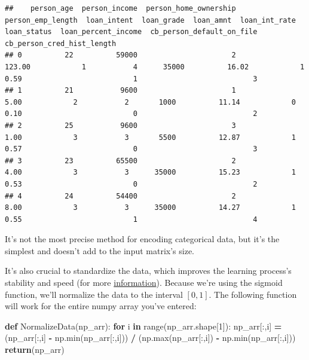 \documentclass[
]{book}
\newenvironment{Shaded}{\begin{snugshade}}{\end{snugshade}}
\newcommand{\BuiltInTok}[1]{#1}
\newcommand{\ControlFlowTok}[1]{\textcolor[rgb]{0.13,0.29,0.53}{\textbf{#1}}}
\newcommand{\DecValTok}[1]{\textcolor[rgb]{0.00,0.00,0.81}{#1}}
\newcommand{\KeywordTok}[1]{\textcolor[rgb]{0.13,0.29,0.53}{\textbf{#1}}}
\newcommand{\NormalTok}[1]{#1}
\newcommand{\OperatorTok}[1]{\textcolor[rgb]{0.81,0.36,0.00}{\textbf{#1}}}
\begin{document}
\begin{verbatim}
##    person_age  person_income  person_home_ownership  person_emp_length  loan_intent  loan_grade  loan_amnt  loan_int_rate  loan_status  loan_percent_income  cb_person_default_on_file  cb_person_cred_hist_length
## 0          22          59000                      2             123.00            1           4      35000          16.02            1                 0.59                          1                           3
## 1          21           9600                      1               5.00            2           2       1000          11.14            0                 0.10                          0                           2
## 2          25           9600                      3               1.00            3           3       5500          12.87            1                 0.57                          0                           3
## 3          23          65500                      2               4.00            3           3      35000          15.23            1                 0.53                          0                           2
## 4          24          54400                      2               8.00            3           3      35000          14.27            1                 0.55                          1                           4
\end{verbatim}

It's not the most precise method for encoding categorical data, but it's the simplest and doesn't add to the input matrix's size.

It's also crucial to standardize the data, which improves the learning process's stability and speed (for more \href{https://machinelearningmastery.com/how-to-improve-neural-network-stability-and-modeling-performance-with-data-scaling/}{information}). Because we're using the sigmoid function, we'll normalize the data to the interval \([0,1]\). The following function will work for the entire numpy array you've entered:

\begin{Shaded}
\begin{Highlighting}[]
\KeywordTok{def}\NormalTok{ NormalizeData(np\_arr):}
  \ControlFlowTok{for}\NormalTok{ i }\KeywordTok{in} \BuiltInTok{range}\NormalTok{(np\_arr.shape[}\DecValTok{1}\NormalTok{]):}
\NormalTok{    np\_arr[:,i] }\OperatorTok{=}\NormalTok{ (np\_arr[:,i] }\OperatorTok{{-}}\NormalTok{ np.}\BuiltInTok{min}\NormalTok{(np\_arr[:,i])) }\OperatorTok{/}\NormalTok{ (np.}\BuiltInTok{max}\NormalTok{(np\_arr[:,i]) }\OperatorTok{{-}}\NormalTok{ np.}\BuiltInTok{min}\NormalTok{(np\_arr[:,i]))}
  \ControlFlowTok{return}\NormalTok{(np\_arr)}
\end{Highlighting}
\end{Shaded}
\end{document}
